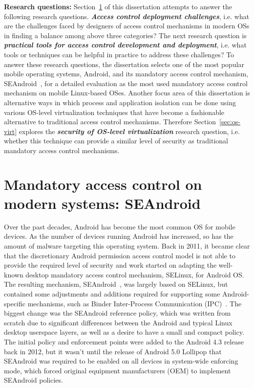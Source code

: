 \textbf{Research questions:}   Section~\ref{sec:seandroid} of this dissertation attempts to answer the following research questions. \textbf{\textit{Access control deployment challenges}}, i.e. what are the challenges faced by designers of access control mechanisms in modern OSs in finding a balance among above three categories? The next research question is \textbf{\textit{practical tools for access control development and deployment}}, i.e. what tools or techniques can be helpful in practice to address these challenges? To answer these research questions, the dissertation selects one of the most popular mobile operating systems, Android, and its mandatory access control mechanism, SEAndroid~\cite{smalley12}, for a detailed evaluation as the most used mandatory access control mechanism on mobile Linux-based OSes. Another focus area of this dissertation is alternative ways in which process and application isolation can be done using various OS-level virtualization  techniques that have become a fashionable alternative to traditional access control mechanisms. Therefore Section~\ref{sec:os-virt} explores the \textit{\textbf{security of OS-level virtualization}} research question, i.e. whether this technique can provide a similar level of security as traditional mandatory access control mechanisms. 


\section{Mandatory access control on modern systems: SEAndroid}
\label{sec:seandroid}

Over the past decades, Android has become the most common OS for mobile devices. As the number of devices running Android has increased, so has the amount of malware targeting this operating system. Back in 2011, it became clear that the discretionary Android permission access control model is not able to provide the required level of security and work started on adapting the well-known desktop mandatory access control mechanism, SELinux, for Android OS. The resulting mechanism, SEAndroid~\cite{smalley12}, was largely based on SELinux, but contained some adjustments and additions required for supporting some Android-specific mechanisms, such as Binder Inter-Process Communication (IPC)~\cite{binder}. The biggest change was the SEAndroid reference policy, which was written from scratch due to significant differences between the Android and typical Linux desktop userspace layers, as well as a desire to have a small and compact policy. The initial policy and enforcement points were added to the Android 4.3 release back in 2012, but it wasn't until the release of Android 5.0 Lollipop that SEAndroid was required to be enabled on all devices in system-wide enforcing mode, which forced original equipment manufacturers (OEM) to implement SEAndroid policies. 

